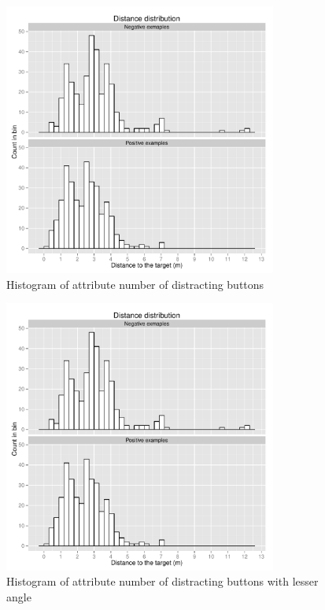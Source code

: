 \begin{figure}[!htbp]
  \centering
	\includegraphics[page=5,width=0.8\textwidth]{Images/fref_distrib}
	\caption{Histogram of attribute number of distracting buttons}
	\label{fig:fref-distrib-distbuttons}
\end{figure}

\begin{figure}[!htbp]
  \centering
	\includegraphics[page=6,width=0.8\textwidth]{Images/fref_distrib}
	\caption{Histogram of attribute number of distracting buttons with lesser angle}
	\label{fig:fref-distrib-distangles}
\end{figure}